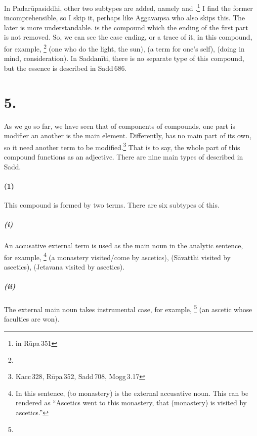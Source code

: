 In Padar\=upasiddhi, other two subtypes are added, namely  and .\footnote{in R\=upa\,351} I find the former incomprehensible, so I skip it, perhaps like Aggava\d msa who also skips this. The later is more understandable.  is the compound which the ending of the first part is not removed. So, we can see the case ending, or a trace of it, in this compound, for example, \footnote{} (one who do the light, the sun),  (a term for one's self),  (doing in mind, consideration). In Saddan\=iti, there is no separate type of this compound, but the essence is described in Sadd\,686.

\section*{5. }\label{sec:bahub}

As we go so far, we have seen that of components of compounds, one part is modifier an another is the main element. Differently,  has no main part of its own, so it need another term to be modified.\footnote{Kacc\,328, R\=upa\,352, Sadd\,708, Mogg\,3.17} That is to say, the whole part of this compound functions as an adjective. There are nine main types of  described in Sadd.

\paragraph*{(1) } This compound is formed by two terms. There are six subtypes of this.

\subparagraph*{(i) } An accusative external term is used as the main noun in the analytic sentence, for example, \footnote{ In this sentence,  (to monastery) is the external accusative noun. This can be rendered as ``Ascetics went to this monastery, that (monastery) is visited by ascetics.''} (a monastery visited/come by ascetics),  (S\=avatthi visited by ascetics),  (Jetavana visited by ascetics).

\subparagraph*{(ii) } The external main noun takes instrumental case, for example, \footnote{} (an ascetic whose faculties are won).

